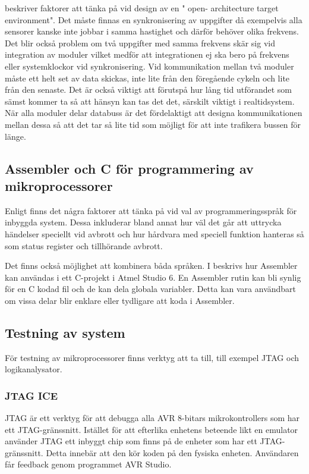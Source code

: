 \documentclass[11pt]{article}
\begin{document}
\begin{flushleft}
\cite{IRS} beskriver faktorer att tänka på vid design av en " open- architecture target environment". Det måste finnas en synkronisering av uppgifter då exempelvis alla sensorer kanske inte jobbar i samma hastighet och därför behöver olika frekvens. Det blir också problem om två uppgifter med samma frekvens skär sig vid integration av moduler vilket medför att integrationen ej ska bero på frekvens eller systemklockor vid synkronisering. Vid kommunikation mellan två moduler måste ett  helt set av data skickas, inte lite från den föregående cykeln och lite från den senaste. Det är också viktigt att förutspå hur lång tid utförandet som sämst kommer ta så att hänsyn kan tas det det, särskilt viktigt i realtidsystem. När alla moduler delar databuss är det fördelaktigt att designa kommunikationen mellan dessa så att det tar så lite tid som möjligt för att inte trafikera bussen för länge.   

\subsection{Assembler och C för programmering av mikroprocessorer}

Enligt \cite{CPC} finns det några faktorer att tänka på vid val av programmeringsspråk för inbyggda system. Dessa inkluderar bland annat hur väl det går att uttrycka händelser speciellt vid avbrott och hur hårdvara med speciell funktion hanteras så som status register och tillhörande avbrott.  

Det finns också möjlighet att kombinera båda språken. I \cite{AssC} beskrivs hur Assembler kan användas i ett C-projekt i Atmel Studio 6. En Assembler rutin kan bli synlig för en C kodad fil och de kan dela globala variabler. Detta kan vara användbart om vissa delar blir enklare eller tydligare att koda i Assembler.

\subsection{Testning av system} 

För testning av mikroprocessorer finns verktyg att ta till, till exempel JTAG och logikanalysator.

\subsubsection{JTAG ICE}

JTAG är ett verktyg för att debugga alla AVR 8-bitars mikrokontrollers som har ett JTAG-gränssnitt. Istället för att efterlika enhetens beteende likt en emulator använder JTAG ett inbyggt chip som finns på de enheter som har ett JTAG-gränssnitt. Detta innebär att den kör koden på den fysiska enheten. Användaren får feedback genom programmet AVR Studio.


\end{flushleft}
\end{document}
